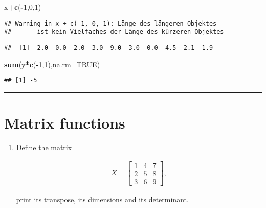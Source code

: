 \documentclass[]{article}
\newenvironment{Shaded}{\begin{snugshade}}{\end{snugshade}}
\newcommand{\KeywordTok}[1]{\textcolor[rgb]{0.13,0.29,0.53}{\textbf{#1}}}
\newcommand{\DataTypeTok}[1]{\textcolor[rgb]{0.13,0.29,0.53}{#1}}
\newcommand{\DecValTok}[1]{\textcolor[rgb]{0.00,0.00,0.81}{#1}}
\newcommand{\OtherTok}[1]{\textcolor[rgb]{0.56,0.35,0.01}{#1}}
\newcommand{\OperatorTok}[1]{\textcolor[rgb]{0.81,0.36,0.00}{\textbf{#1}}}
\newcommand{\NormalTok}[1]{#1}
\providecommand{\tightlist}{%
  \setlength{\itemsep}{0pt}\setlength{\parskip}{0pt}}
\begin{document}
\begin{Shaded}
\begin{Highlighting}[]
\NormalTok{x}\OperatorTok{+}\KeywordTok{c}\NormalTok{(}\OperatorTok{-}\DecValTok{1}\NormalTok{,}\DecValTok{0}\NormalTok{,}\DecValTok{1}\NormalTok{)}
\end{Highlighting}
\end{Shaded}

\begin{verbatim}
## Warning in x + c(-1, 0, 1): Länge des längeren Objektes
##       ist kein Vielfaches der Länge des kürzeren Objektes
\end{verbatim}

\begin{verbatim}
##  [1] -2.0  0.0  2.0  3.0  9.0  3.0  0.0  4.5  2.1 -1.9
\end{verbatim}

\begin{Shaded}
\begin{Highlighting}[]
\KeywordTok{sum}\NormalTok{(y}\OperatorTok{*}\KeywordTok{c}\NormalTok{(}\OperatorTok{-}\DecValTok{1}\NormalTok{,}\DecValTok{1}\NormalTok{),}\DataTypeTok{na.rm=}\OtherTok{TRUE}\NormalTok{)}
\end{Highlighting}
\end{Shaded}

\begin{verbatim}
## [1] -5
\end{verbatim}

\begin{center}\rule{0.5\linewidth}{\linethickness}\end{center}

\section{Matrix functions}\label{matrix-functions}

\begin{enumerate}
\def\labelenumi{\arabic{enumi}.}
\tightlist
\item
  Define the matrix

  \begin{align*}
  X=\left[ 
  \begin{array}{lll}
  1 & 4 & 7 \\ 
  2 & 5 & 8 \\ 
  3 & 6 & 9
  \end{array}
  \right] ,
  \end{align*}

  print its transpose, its dimensions and its determinant.
\end{enumerate}
\end{document}
